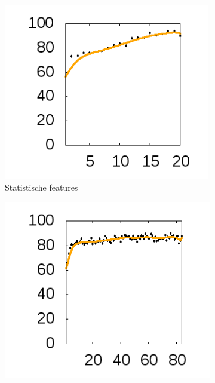 \documentclass{article}
\begin{document}
\begin{figure}[htb]
\centering

  \begin{subfigure}[b]{.49\linewidth}
    \centering
    \includegraphics[width=0.99\textwidth]{figures/StatisticFeatures}
    \caption{Statistische features}\label{fig:1a}
  \end{subfigure}%
  \begin{subfigure}[b]{.49\linewidth}
    \centering
    \includegraphics[width=.99\textwidth]{figures/FFTFeatures}

\end{subfigure}
\end{figure}
\end{document}
